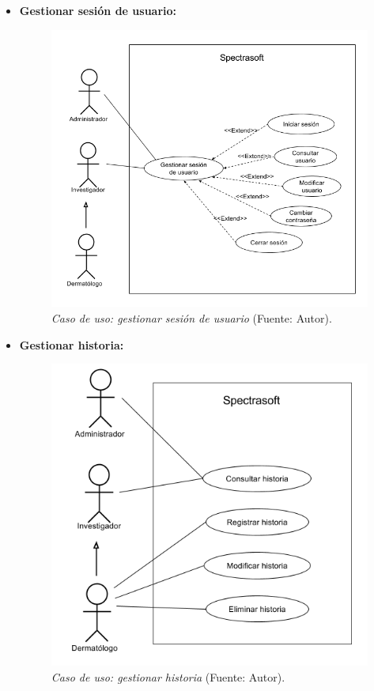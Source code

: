 \begin{itemize}
\newpage
	 	\item \textbf{Gestionar sesi\'{o}n de usuario:}
 	
 		\begin{figure}[H]
		\centering
		\includegraphics[scale=0.5]{img/cu-gestion-sesion.png}
			\caption[Caso de uso: gestionar sesi\'{o}n de usuario]{\textit{Caso de uso: gestionar sesi\'{o}n de usuario} (Fuente: Autor).}
	\end{figure}
	
		 	\item \textbf{Gestionar historia:}
 	
 		\begin{figure}[H]
		\centering
		\includegraphics[scale=0.5]{img/cu-gestion-historia.png}
			\caption[Caso de uso: gestionar historia]{\textit{Caso de uso: gestionar historia} (Fuente: Autor).}
	\end{figure}


\end{itemize}
